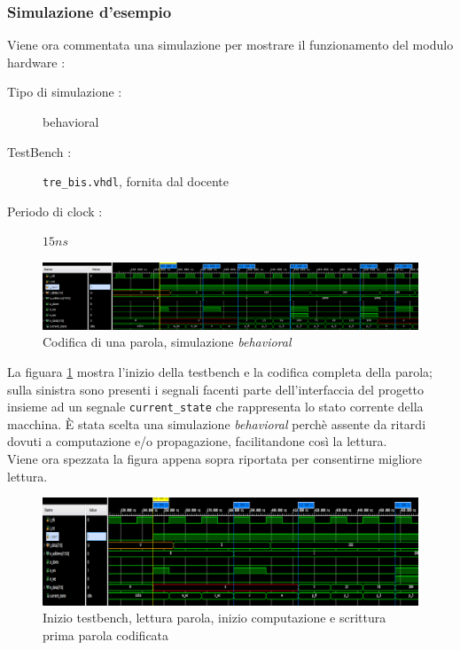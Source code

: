 \documentclass[11pt,a4paper]{article}
\begin{document}
            \subsubsection{Simulazione d'esempio}
                Viene ora commentata una simulazione per mostrare il funzionamento del modulo hardware :
                \begin{description}
                    \item[Tipo di simulazione : ] behavioral
                    \item[TestBench : ] \texttt{tre\_bis.vhdl}, fornita dal docente 
                    \item[Periodo di clock : ] $15ns$ 
                \end{description}
                \begin{figure}[h]
                    \centering
                    \includegraphics[width = \linewidth]{totale.png}
                    \caption{Codifica di una parola, simulazione \textit{behavioral}}
                    \label{behavioral_totale}
                \end{figure}
                La figuara \ref{behavioral_totale} mostra l'inizio della testbench e la codifica completa della parola; sulla sinistra sono presenti i segnali facenti parte dell'interfaccia del progetto insieme ad un segnale \texttt{current\_state} che rappresenta lo stato corrente della macchina.
                È stata scelta una simulazione \textit{behavioral} perchè assente da ritardi dovuti a computazione e/o propagazione, facilitandone così la lettura.\\
                Viene ora spezzata la figura appena sopra riportata per consentirne migliore lettura.
                \newpage
                \begin{figure}[h]
                    \centering
                    \includegraphics[width = \linewidth]{primi_4_scaled.png}
                    \caption{Inizio testbench, lettura parola, inizio computazione e scrittura prima parola codificata}
                    \label{behavioral_primi_4}
                \end{figure}
\end{document}
